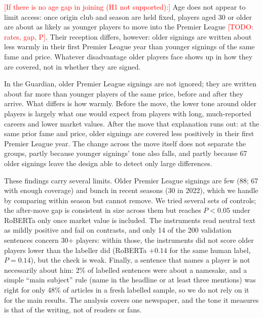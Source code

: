 \documentclass[9pt,twocolumn,twoside]{pnas-new}
\newcommand{\todo}[1]{\textcolor{red}{[TODO: #1]}}
\begin{document}
\textcolor{red}{[If there is no age gap in joining (H1 not supported):]} Age does not appear to limit access: once origin club and season are held fixed, players aged 30 or older are about as likely as younger players to move into the Premier League \todo{rates, gap, P}. Their reception differs, however: older signings are written about less warmly in their first Premier League year than younger signings of the same fame and price. Whatever disadvantage older players face shows up in how they are covered, not in whether they are signed.

In the Guardian, older Premier League signings are not ignored; they are written about far more than younger players of the same price, before and after they arrive. What differs is how warmly. Before the move, the lower tone around older players is largely what one would expect from players with long, much-reported careers and lower market values. After the move that explanation runs out: at the same prior fame and price, older signings are covered less positively in their first Premier League year. The change across the move itself does not separate the groups, partly because younger signings' tone also falls, and partly because 67 older signings leave the design able to detect only large differences.

These findings carry several limits. Older Premier League signings are few (88; 67 with enough coverage) and bunch in recent seasons (30 in 2022), which we handle by comparing within season but cannot remove. We tried several sets of controls; the after-move gap is consistent in size across them but reaches $P<0.05$ under RoBERTa only once market value is included. The instruments read neutral text as mildly positive and fail on contrasts, and only 14 of the 200 validation sentences concern 30+ players: within those, the instruments did not score older players lower than the labeller did (RoBERTa $+0.14$ for the same human label, $P=0.14$), but the check is weak. Finally, a sentence that names a player is not necessarily about him: 2\% of labelled sentences were about a namesake, and a simple ``main subject'' rule (name in the headline or at least three mentions) was right for only 48\% of articles in a fresh labelled sample, so we do not rely on it for the main results. The analysis covers one newspaper, and the tone it measures is that of the writing, not of readers or fans.
\end{document}
